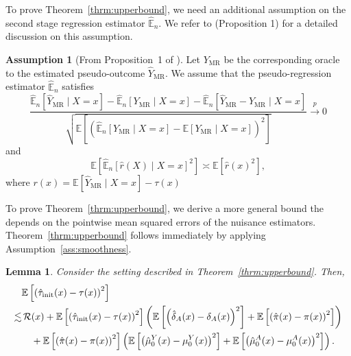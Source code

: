 \documentclass{article} %
\newcommand{\E}{\mathbb{E}}
\theoremstyle{definition}
\newtheorem{assumption}{Assumption}
\theoremstyle{plain}
\newtheorem{lemma}{Lemma}
\begin{document}
To prove Theorem~\ref*{thrm:upperbound}, we need an additional assumption on the second stage regression estimator $\hat{\E}_n$. We refer to \citet{Kennedy.2022d} (Proposition 1) for a detailed discussion on this assumption.

\begin{assumption}[From Proposition~1 of \citet{Kennedy.2022d}]\label{ass:kennedy}
Let $Y_{\mathrm{\mathrm{MR}}}$ be the corresponding oracle to the estimated pseudo-outcome $\hat{Y}_{\mathrm{\mathrm{MR}}}$. We assume that the pseudo-regression estimator $\hat{\E}_n$ satisfies
\begin{equation}
    \frac{\hat{\E}_n[\hat{Y}_{\mathrm{MR}} \mid X = x] - \hat{\E}_n[{Y}_{\mathrm{MR}} \mid X = x] - \hat{\E}_n[\hat{Y}_{\mathrm{\mathrm{MR}}} - {Y}_{\mathrm{\mathrm{MR}}} \mid X = x]}{\sqrt{\E\left[\left(\hat{\E}_n[{Y}_{\mathrm{MR}} \mid X = x] - \E[{Y}_{\mathrm{MR}} \mid X = x] \right)^2\right]}} \overset{p}{\to} 0
\end{equation}
and 
\begin{equation}
  \E\left[\hat{\E}_n[\hat{r}(X) \mid X = x]^2 \right]  \asymp \E\left[\hat{r}(x)^2 \right],
\end{equation}
where $r(x) = \E[\hat{Y}_{\mathrm{\mathrm{MR}}} \mid X = x] - \tau(x)$
\end{assumption}

To prove Theorem~\ref{thrm:upperbound}, we derive a more general bound the depends on the pointwise mean squared errors of the nuisance estimators. Theorem~\ref{thrm:upperbound} follows immediately by applying Assumption~\ref*{ass:smoothness}.
\begin{lemma}\label{lem:general_bound}
Consider the setting described in Theorem~\ref{thrm:upperbound}. Then, 
\begin{align}\label{eq:upperbound_general}
   & \E\left[\left(\hat{\tau}_{\mathrm{init}}(x) - \tau(x)\right)^2\right] \\  \lesssim & \, \mathcal{R}(x)  + \E\left[\left(\hat{\tau}_{\mathrm{init}}(x) - \tau(x)\right)^2\right] \left( \E\left[\left(\hat{\delta}_A(x) - \delta_A(x)\right)^2\right] + \E\left[\left(\hat{\pi}(x) - \pi(x)\right)^2\right]\right) \notag
    \\ & \quad + \E\left[\left(\hat{\pi}(x) - \pi(x)\right)^2\right] \left(\E\left[\left(\hat{\mu}_0^Y(x) - \mu_0^Y(x)\right)^2\right] 
     + \E\left[\left(\hat{\mu}_0^A(x) - \mu_0^A(x)\right)^2\right] \right).
\end{align}
\end{lemma}
\end{document}

